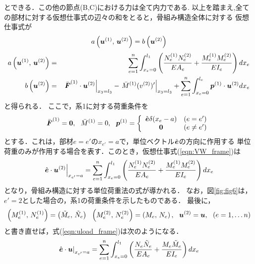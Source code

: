 \documentclass[10pt,a4j]{jarticle}
\begin{document}
とできる．この他の節点(B,C)における力は全て内力である.
以上を踏まえ,全ての部材に対する仮想仕事式の辺々の和をとると，骨組み構造全体に対する
仮想仕事式が
\begin{equation}
	a\left(
		 \mbox{\boldmath $u$}^{(1)}
		,\,  
		\mbox{\boldmath $u$}^{(2)}
	\right) 
	=
	b\left( 
		\mbox{\boldmath $u$}^{(2)}
	\right)
	\label{eqn:VW_frame}
\end{equation}
\begin{eqnarray}
	a\left(
		\mbox{\boldmath $u$}^{(1)}
		,\,  
		\mbox{\boldmath $u$}^{(2)}
	\right) 
	&=& 
	\sum_{e=1}^n 
	\int_{x_e=0}^{l_1} 
	\left(
	\frac{N_e^{(1)}N_e^{(2)}}{EA_e}
	+
	\frac{M_e^{(1)}M_e^{(2)}}{EI_e}
	\right)
	dx_e
	\label{eqn:}
	\\
	b\left( 
		 \mbox{\boldmath $u$}^{(2)}
	\right)
	&=&
	\left.
	\bar{\mbox{\boldmath $F$}}^{(1)} \cdot \mbox{\boldmath $u$}^{(2)}
	\right|_{x_3=l_3}
	-
	\left.
	\bar{M}^{(1)}(v^{(2)})'
	\right|_{x_3=l_3}
	+
	\sum_{e=1}^n 
	\int_{x_e=0}^{l_e} 
	\mbox{\boldmath $p$}^{(1)} \cdot \mbox{\boldmath $u$}^{(2)}dx_e
\end{eqnarray}
と得られる．
ここで，系1に対する荷重条件を
\begin{equation}
	\bar{\fat{F}}^{(1)}=\fat{0}, \ \ \bar M^{(1)} =0, 
	\ \ 
	\fat{p}^{(1)}=
	\left\{
	\begin{array}{cc}
	\hat{\fat{e}}\delta (x_{e}-a) & (e=e') \\
	\fat{0} & (e\neq e')
	\end{array}
	\right.
	\label{eqn:}
\end{equation}
とする．これは，部材$e=e'$の$x_{e'}=a$で，単位ベクトル$\hat{\mbox{\boldmath $e$}}$の方向に作用する
単位荷重のみが作用する場合を表す．このとき，仮想仕事式(\ref{eqn:VW_frame})は
\begin{equation}
	\left.
	\hat{\mbox{\boldmath $e$}}\cdot \mbox{\boldmath $u$}^{(2)}
	\right|_{x_{e'}=a}
	=
	\sum_{e=1}^n 
	\int_{x_e=0}^{l_1} 
	\left(
	\frac{N_e^{(1)}N_e^{(2)}}{EA_e}
	+
	\frac{M_e^{(1)}M_e^{(2)}}{EI_e}
	\right)
	dx_e
	\label{eqn:uload_frame}
\end{equation}
となり，骨組み構造に対する単位荷重法の式が導かれる．
なお，図\ref{fig:fig6}は，$e'=2$とした場合の，系1の荷重条件を示したものである．
最後に，
\begin{equation}
	\left(M^{(1)}_e,\, N_e^{(1)}\right)
	=
	\left(	\tilde M_e,\, \tilde N_e \right)
	\ \ 
	\left(M^{(2)}_e,\,N_e^{(2)}\right)
	=
	\left( M_e,\, N_e \right), \ \ 
	\fat{u}^{(2)}=\fat{u}, \ \ (e=1,\dots n)
	\label{eqn:}
\end{equation}
と書き直せば，式(\ref{eqn:uload_frame})は次のようになる．
\begin{equation}
	\left.
	\hat{\mbox{\boldmath $e$}}\cdot \mbox{\boldmath $u$}
	\right|_{x_{e'}=a}
	=
	\sum_{e=1}^n 
	\int_{x_e=0}^{l_1} 
	\left(
	\frac{N_e \tilde N_e}{EA_e}
	+
	\frac{M_e \tilde M_e}{EI_e}
	\right)
	dx_e
	\label{eqn:uload_frame2}
\end{equation}
\end{document}
